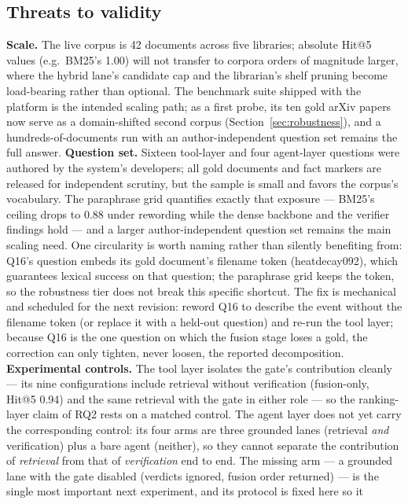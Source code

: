 \subsection{Threats to validity}
\label{sec:threats}
\textbf{Scale.} The live corpus is 42 documents across five libraries;
absolute Hit@5 values (e.g.\ BM25's 1.00) will not transfer to corpora
orders of magnitude larger, where the hybrid lane's candidate cap and the
librarian's shelf pruning become load-bearing rather than optional. The
benchmark suite shipped with the platform is the intended scaling path;
as a first probe, its ten gold arXiv papers now serve as a domain-shifted
second corpus (Section~\ref{sec:robustness}), and a
hundreds-of-documents run with an author-independent question set remains
the full answer.
\textbf{Question set.} Sixteen tool-layer and four agent-layer questions
were authored by the system's developers; all gold documents and fact
markers are released for independent scrutiny, but the sample is small and
favors the corpus's vocabulary. The paraphrase grid quantifies exactly
that exposure --- BM25's ceiling drops to 0.88 under rewording while the
dense backbone and the verifier findings hold --- and a larger
author-independent question set remains the main scaling need. One
circularity is worth naming rather than silently benefiting from: Q16's
question embeds its gold document's filename token (heatdecay092), which
guarantees lexical success on that question; the paraphrase grid keeps
the token, so the robustness tier does not break this specific shortcut. The
fix is mechanical and scheduled for the next revision: reword Q16 to describe
the event without the filename token (or replace it with a held-out question)
and re-run the tool layer; because Q16 is the one question on which the fusion
stage loses a gold, the correction can only tighten, never loosen, the
reported decomposition.
\textbf{Experimental controls.} The tool layer isolates the gate's
contribution cleanly --- its nine configurations include retrieval without
verification (fusion-only, Hit@5 0.94) and the same retrieval with the gate in
either role --- so the ranking-layer claim of RQ2 rests on a matched control.
The agent layer does not yet carry the corresponding control: its four arms
are three grounded lanes (retrieval \emph{and} verification) plus a bare agent
(neither), so they cannot separate the contribution of \emph{retrieval} from
that of \emph{verification} end to end. The missing arm --- a grounded lane
with the gate disabled (verdicts ignored, fusion order returned) --- is the
single most important next experiment, and its protocol is fixed here so it
